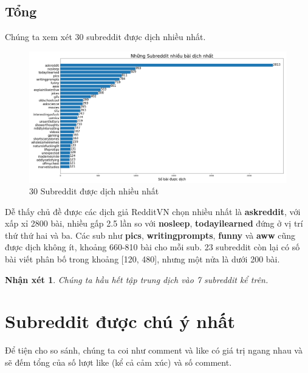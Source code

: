 \documentclass[10pt,a4paper]{article}
\newtheorem{remark}{Nhận xét}
\begin{document}
\subsection{Tổng}
Chúng ta xem xét 30 subreddit được dịch nhiều nhất.
\begin{figure}[!h]
    \centering
    \includegraphics[width=\textwidth]{img/TopTranslatedSubreddits.png}
    \caption{30 Subreddit được dịch nhiều nhất}
    \label{fig:toptranslatedsubreddits}
\end{figure}

Dễ thấy chủ đề được các dịch giả RedditVN chọn nhiều nhất là \textbf{askreddit}, với xấp xỉ 2800 bài, nhiều gấp 2.5 lần so với \textbf{nosleep}, \textbf{todayilearned} đứng ở vị trí thứ thứ hai và ba. Các sub như \textbf{pics}, \textbf{writingprompts}, \textbf{funny} và \textbf{aww} cũng được dịch không ít, khoảng 660-810 bài cho mỗi sub. 23 subreddit còn lại có số bài viết phân bố trong khoảng [120, 480], nhưng một nửa là dưới 200 bài.

\begin{remark}
    \label{re:top6subreddits}
    Chúng ta hầu hết tập trung dịch vào 7 subreddit kể trên.
\end{remark}

\section{Subreddit được chú ý nhất}
\label{sec:interest}

Để tiện cho so sánh, chúng ta coi như comment và like có giá trị ngang nhau và sẽ đếm tổng của số lượt like (kể cả cảm xúc) và số comment.
\end{document}
